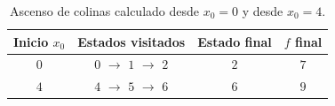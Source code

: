 \begin{table}[H]
\centering
\small
\setlength{\tabcolsep}{6pt}
\renewcommand{\arraystretch}{1.15}
\begin{tabular}{|c|c|c|c|}
\hline
\rowcolor{encabezado}\textbf{Inicio $x_0$} & \textbf{Estados visitados} & \textbf{Estado final} & \textbf{$f$ final} \\
\hline
$0$ & $0$ $\to$ $1$ $\to$ $2$ & $2$ & $7$ \\
\hline
$4$ & $4$ $\to$ $5$ $\to$ $6$ & $6$ & $9$ \\
\hline
\end{tabular}
\caption{Ascenso de colinas calculado desde $x_0=0$ y desde $x_0=4$.}
\label{tab:p2a-trazas}
\end{table}
